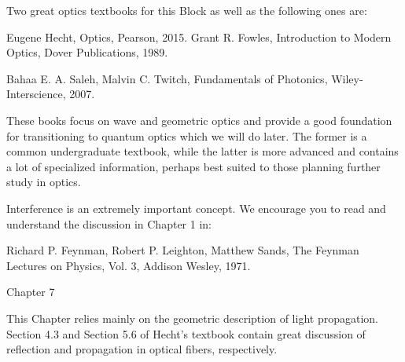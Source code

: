 Two great optics textbooks for this Block as well as the following ones are:

Eugene Hecht, Optics, Pearson, 2015.
Grant R. Fowles, Introduction to Modern Optics, Dover Publications, 1989.

Bahaa E. A. Saleh, Malvin C. Twitch, Fundamentals of Photonics, Wiley-Interscience, 2007.

These books focus on wave and geometric optics and provide a good foundation for transitioning to quantum optics which we will do later. The former is a common undergraduate textbook, while the latter is more advanced and contains a lot of specialized information, perhaps best suited to those planning further study in optics.

Interference is an extremely important concept. We encourage you to read and understand the discussion in Chapter 1 in:

Richard P. Feynman, Robert P. Leighton, Matthew Sands, The Feynman Lectures on Physics, Vol. 3, Addison Wesley, 1971.

Chapter 7

This Chapter relies mainly on the geometric description of light propagation. Section 4.3 and Section 5.6 of Hecht’s textbook contain great discussion of reflection and propagation in optical fibers, respectively.
